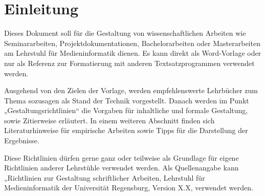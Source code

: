 \section{Einleitung}\label{sec:Einleitung}

Dieses Dokument soll für die Gestaltung von wissenschaftlichen Arbeiten wie Seminararbeiten, Projektdokumentationen, Bachelorarbeiten oder Masterarbeiten am Lehrstuhl für Medieninformatik dienen. Es kann direkt als Word-Vorlage oder nur als Referenz zur Formatierung mit anderen Textsatzprogrammen verwendet werden. 

Ausgehend von den Zielen der Vorlage, werden empfehlenswerte Lehrbücher zum Thema sozusagen als Stand der Technik vorgestellt. Danach werden im Punkt „Gestaltungsrichtlinien“ die Vorgaben für inhaltliche und formale Gestaltung, sowie Zitierweise erläutert. In einem weiteren Abschnitt finden sich Literaturhinweise für empirische Arbeiten sowie Tipps für die Darstellung der Ergebnisse.

Diese Richtlinien dürfen gerne ganz oder teilweise als Grundlage für eigene Richtlinien anderer Lehrstühle verwendet werden. Als Quellenangabe kann „Richtlinien zur Gestaltung schriftlicher Arbeiten, Lehrstuhl für Medieninformatik der Universität Regensburg, Version X.X, verwendet werden.
